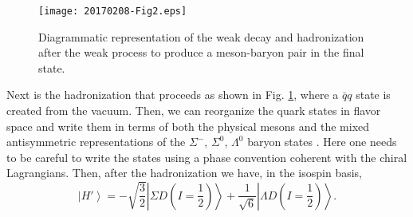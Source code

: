 \documentclass{PoS}
\begin{document}
\begin{figure}[h!]
\centering
  \texttt{[image: 20170208-Fig2.eps]}
  \caption{Diagrammatic representation of the weak decay and hadronization after the weak process to produce a meson-baryon pair in the final state.}
  \label{fig:decay2}
\end{figure}

Next is the hadronization that proceeds as shown in Fig. \ref{fig:decay2}, where a $\bar{q}q$ state is created from the vacuum. Then, we can reorganize the quark states in flavor space and write them in terms of both the physical mesons and the mixed antisymmetric representations of the $\Sigma^-$,  $\Sigma^0$, $\Lambda^0$ baryon states \cite{close}. Here one needs to be careful to write the states using a phase convention coherent with the chiral Lagrangians.
Then, after the hadronization we have, in the isospin basis,
\begin{equation}
\label{Eq.:isoH}
\left|H' \right\rangle = -\sqrt{\frac{3}{2}} \left| \Sigma D (I=\frac{1}{2}) \right\rangle+\frac{1}{\sqrt{6}} \left| \Lambda D (I=\frac{1}{2}) \right\rangle.
\end{equation}
\end{document}
